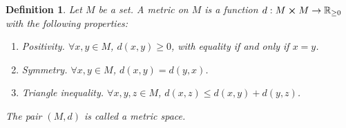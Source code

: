 \documentclass{article}
\theoremstyle{plain}\theoremheaderfont{\normalfont\itshape}\theorembodyfont{\rmfamily}\theoremseparator{.}\newtheorem*{rem}{Remark}\newtheorem*{ex}{Example}\newtheorem*{proof}{Proof}\newtheorem*{altp}{Alternative proof}
\theoremstyle{plain}\theoremheaderfont{\normalfont\bfseries}\theorembodyfont{\rmfamily}\theoremseparator{.}\newtheorem{thm}{Theorem}[section]\newtheorem{lem}[thm]{Lemma}\newtheorem{prop}[thm]{Proposition}\newtheorem*{cor}{Corollary}\newtheorem{defn}[thm]{Definition}\newtheorem{clm}[thm]{Claim}\newtheorem{clminproof}{Claim}
\theoremstyle{break}\theoremheaderfont{\normalfont\itshape}\theorembodyfont{\rmfamily}\theoremseparator{.\medskip}\newtheorem*{proofskip}{Proof}\newtheorem*{exs}{Examples}\newtheorem*{rems}{Remarks}
\theoremstyle{break}\theoremheaderfont{\normalfont\bfseries}\theorembodyfont{\rmfamily}\theoremseparator{.\medskip}\newtheorem{lemskip}[thm]{Lemma}\newtheorem{defnskip}[thm]{Definition}\newtheorem{propskip}[thm]{Proposition}\newtheorem{thmskip}[thm]{Theorem}
\begin{document}
    \begin{defn}
        Let \(M\) be a set. A \textit{metric} on \(M\) is a function \(d:M\cross M\to\mathbb{R}_{\ge 0}\) with the following properties:
        \begin{enumerate}[topsep=0pt]
            \item \textit{Positivity.} \(\forall x,y\in M\), \(d(x,y)\ge 0\), with equality if and only if \(x=y\).
            \item \textit{Symmetry.} \(\forall x,y\in M\), \(d(x,y)=d(y,x)\).
            \item \textit{Triangle inequality.} \(\forall x,y,z\in M\), \(d(x,z)\le d(x,y)+d(y,z)\).
        \end{enumerate}
        The pair \((M,d)\) is called a \textit{metric space}.
    \end{defn}
\end{document}
